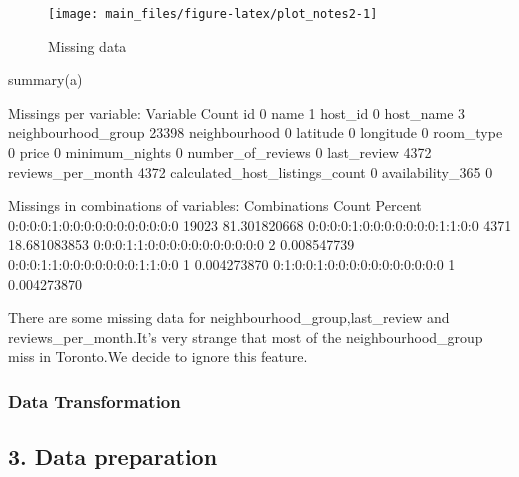 \begin{Schunk}
\begin{figure}[H]

{\centering \texttt{[image: main\_files/figure-latex/plot\_notes2-1]} 

}

\caption[Missing data]{Missing data}\label{fig:plot_notes2}
\end{figure}
\end{Schunk}

\begin{Schunk}
\begin{Sinput}
summary(a)
\end{Sinput}
\begin{Soutput}

 Missings per variable: 
                       Variable Count
                             id     0
                           name     1
                        host_id     0
                      host_name     3
            neighbourhood_group 23398
                  neighbourhood     0
                       latitude     0
                      longitude     0
                      room_type     0
                          price     0
                 minimum_nights     0
              number_of_reviews     0
                    last_review  4372
              reviews_per_month  4372
 calculated_host_listings_count     0
               availability_365     0

 Missings in combinations of variables: 
                    Combinations Count      Percent
 0:0:0:0:1:0:0:0:0:0:0:0:0:0:0:0 19023 81.301820668
 0:0:0:0:1:0:0:0:0:0:0:0:1:1:0:0  4371 18.681083853
 0:0:0:1:1:0:0:0:0:0:0:0:0:0:0:0     2  0.008547739
 0:0:0:1:1:0:0:0:0:0:0:0:1:1:0:0     1  0.004273870
 0:1:0:0:1:0:0:0:0:0:0:0:0:0:0:0     1  0.004273870
\end{Soutput}
\end{Schunk}

There are some missing data for neighbourhood\_group,last\_review and
reviews\_per\_month.It's very strange that most of the
neighbourhood\_group miss in Toronto.We decide to ignore this feature.

\hypertarget{data-transformation}{%
\subsubsection{Data Transformation}\label{data-transformation}}

\hypertarget{data-preparation}{%
\subsection{3. Data preparation}\label{data-preparation}}


